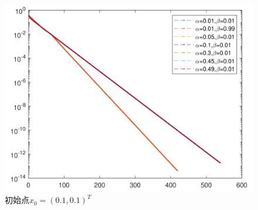 \documentclass{article}
\begin{document}
\begin{figure}[H]
{\begin{minipage}[t]{0.48\textwidth}
            \includegraphics[scale=0.5]{Fig/group3_0101.png}
        \end{minipage}
    }
    \caption{初始点$x_0=(0.1,0.1)^T$}


\end{figure}
\end{document}
